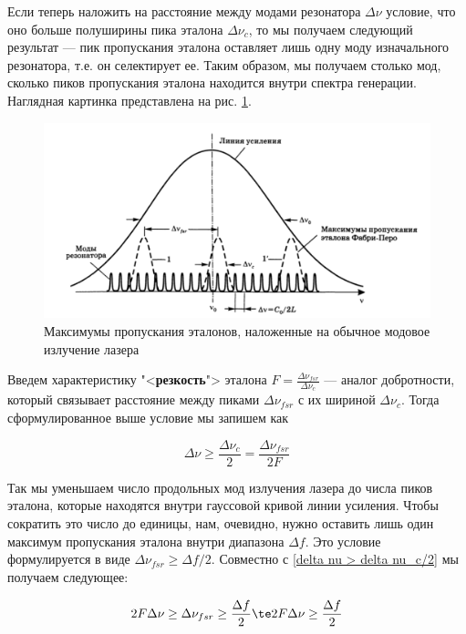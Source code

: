 \documentclass[12pt]{kiarticle}
\begin{document}
Если теперь наложить на расстояние между модами резонатора $ \Delta \nu $ условие, что оно больше полуширины пика эталона $ \Delta \nu_c $, то мы получаем следующий результат --- пик пропускания эталона оставляет лишь одну моду изначального резонатора, т.е. он селектирует ее. Таким образом, мы получаем столько мод, сколько пиков пропускания эталона находится внутри спектра генерации. Наглядная картинка представлена на рис. \ref{selection}. 

\begin{figure}[h!]
 	\centering
 	\includegraphics[width=\linewidth]{selection}
 	\caption{{\small Максимумы пропускания эталонов, наложенные на обычное модовое излучение лазера}}
 	\label{selection}
\end{figure}

Введем характеристику "<\textbf{резкость}"> эталона $ F = \frac{\Delta \nu_{fsr}}{\Delta \nu_c} $ --- аналог добротности, который связывает расстояние между пиками $ \Delta \nu_{fsr} $ с их шириной $ \Delta \nu_c $. Тогда сформулированное выше условие мы запишем как

\begin{equation}\label{delta nu > delta nu_c/2}
\Delta \nu \geq \dfrac{\Delta \nu_c}{2} = \dfrac{\Delta \nu_{fsr}}{2F}
\end{equation}

Так мы уменьшаем число продольных мод излучения лазера до числа пиков эталона, которые находятся внутри гауссовой кривой линии усиления. Чтобы сократить это число до единицы, нам, очевидно, нужно оставить лишь один максимум пропускания эталона внутри диапазона $ \Delta f $. Это условие формулируется в виде $ \Delta \nu_{fsr} \geq \Delta f /2$. Совместно с \eqref{delta nu > delta nu_c/2}  мы получаем следующее:

\begin{equation}\label{}
2 F \Delta \nu \geq \Delta \nu_{fsr} \geq \dfrac{\Delta f}{2} \te 2 F \Delta \nu \geq \dfrac{\Delta f}{2}
\end{equation}
\end{document}
